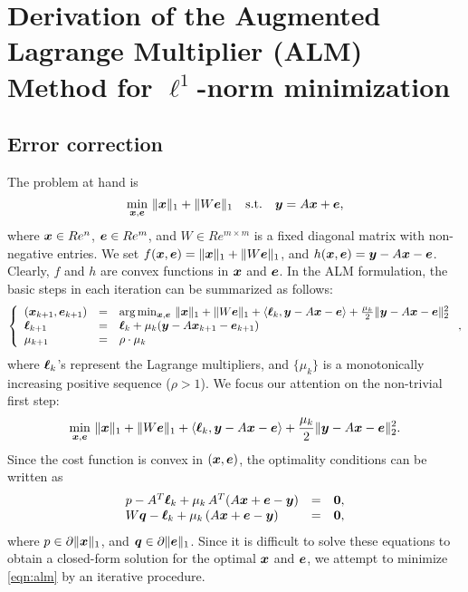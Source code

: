 \section{Derivation of the Augmented Lagrange Multiplier (ALM) Method for $\ell^1$-norm minimization}

\subsection{Error correction}

The problem at hand is 
\begin{equation}
\min_{{\boldsymbol{x}},\boldsymbol{e}} \, \|{\boldsymbol{x}}\|_1 + \|W\boldsymbol{e}\|_1 \quad \mathrm{s.t.} \quad {\boldsymbol{y}} = A{\boldsymbol{x}} + \boldsymbol{e},
\end{equation}
where ${\boldsymbol{x}} \in Re^n$, $\boldsymbol{e} \in Re^m$, and $W \in Re^{m \times m}$ is a fixed diagonal matrix with non-negative entries. 
\smallbreak
We set $f({\boldsymbol{x}},\boldsymbol{e}) = \|{\boldsymbol{x}}\|_1 + \|W\boldsymbol{e}\|_1$, and $h({\boldsymbol{x}},\boldsymbol{e}) = {\boldsymbol{y}} - A{\boldsymbol{x}} - \boldsymbol{e}$. Clearly, $f$ and $h$ are convex functions in ${\boldsymbol{x}}$ and $\boldsymbol{e}$. In the ALM formulation, the basic steps in each iteration can be summarized as follows:
\begin{equation}
\left \{ 
\begin{array}{lll}
({\boldsymbol{x}}_{k+1},\boldsymbol{e}_{k+1}) & = & \arg\min_{{\boldsymbol{x}},\boldsymbol{e}} \, \|{\boldsymbol{x}}\|_1 + \|W\boldsymbol{e}\|_1 + \langle {\boldsymbol\ell}_k, {\boldsymbol{y}} - A{\boldsymbol{x}} - \boldsymbol{e} \rangle + \frac{\mu_k}{2}\|{\boldsymbol{y}} - A{\boldsymbol{x}} - \boldsymbol{e}\|_2^2 \\
{\boldsymbol \ell}_{k+1} & = & {\boldsymbol \ell}_k + \mu_k ({\boldsymbol{y}} - A{\boldsymbol{x}}_{k+1} - \boldsymbol{e}_{k+1}) \\
\mu_{k+1} & = & \rho\cdot\mu_k
\end{array} 
\right . ,
\end{equation}
where ${\boldsymbol \ell}_k$'s represent the Lagrange multipliers, and $\{\mu_k\}$ is a monotonically increasing positive sequence ($\rho > 1$).
\smallbreak
We focus our attention on the non-trivial first step:
\begin{equation}
\min_{{\boldsymbol{x}},\boldsymbol{e}} \, \|{\boldsymbol{x}}\|_1 + \|W\boldsymbol{e}\|_1 + \langle {\boldsymbol\ell}_k, {\boldsymbol{y}} - A{\boldsymbol{x}} - \boldsymbol{e} \rangle + \frac{\mu_k}{2}\|{\boldsymbol{y}} - A{\boldsymbol{x}} - \boldsymbol{e}\|_2^2.
\label{eqn:alm}
\end{equation}
Since the cost function is convex in $({\boldsymbol{x}},\boldsymbol{e})$, the optimality conditions can be written as
\begin{equation}
\begin{array}{lll}
{p} - A^T{\boldsymbol \ell}_k + \mu_k\,A^T(A{\boldsymbol{x}} + \boldsymbol{e} - {\boldsymbol{y}}) & = & \boldsymbol{0}, \\
W{\boldsymbol q} - {\boldsymbol \ell}_k + \mu_k\, (A{\boldsymbol{x}} + \boldsymbol{e} -{\boldsymbol{y}}) & = & \boldsymbol{0},
\end{array}
\end{equation}
where ${p} \in \partial \|{\boldsymbol{x}}\|_1$, and ${\boldsymbol q} \in \partial \|\boldsymbol{e}\|_1$. Since it is difficult to solve these equations to obtain a closed-form solution for the optimal ${\boldsymbol{x}}$ and $\boldsymbol{e}$, we attempt to minimize \eqref{eqn:alm} by an iterative procedure. 

